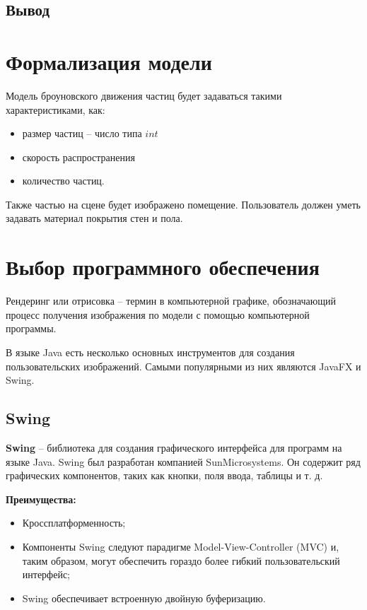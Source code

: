 \subsection*{Вывод}

\newpage

\section{Формализация модели}
Модель броуновского движения частиц будет задаваться такими характеристиками, как:
\begin{itemize} 
    \item размер частиц -- число типа $int$
    \item скорость распространения
    \item количество частиц.
\end{itemize}

Также частью на сцене будет изображено помещение. Пользователь должен уметь задавать материал покрытия стен и пола.


\section{Выбор программного обеспечения}

Рендеринг или отрисовка -- термин в компьютерной графике, обозначающий процесс получения изображения по модели с помощью компьютерной программы.

В языке Java есть несколько основных инструментов для создания пользовательских изображений. Самыми популярными из них являются JavaFX и Swing.

\subsection{Swing}

\textbf{Swing} -- библиотека для создания графического интерфейса для программ на языке Java. Swing был разработан компанией SunMicrosystems. Он содержит ряд графических компонентов, таких как кнопки, поля ввода, таблицы и т. д.

\textbf{Преимущества:} 
\begin{itemize}
    \item Кроссплатформенность;
    \item Компоненты Swing следуют парадигме Model-View-Controller (MVC) и, таким образом, могут обеспечить гораздо более гибкий пользовательский интерфейс;
    \item Swing обеспечивает встроенную двойную буферизацию.
\end{itemize}

